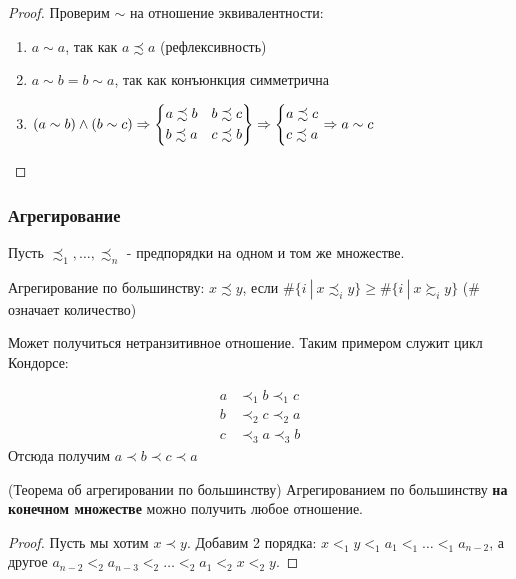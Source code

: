\begin{proof}
	Проверим $\sim$ на отношение эквивалентности:
	\begin{enumerate}
		\item $a \sim a$, так как $a \precsim a$ (рефлексивность)
		\item $a \sim b = b \sim a$, так как конъюнкция симметрична
		\item $(a \sim b) \wedge (b \sim c) \Rightarrow \left\{\begin{aligned}
			a \precsim b & &b \precsim c \\ b \precsim a & &c \precsim b
		\end{aligned}\right\} \Rightarrow \left\{\begin{aligned}a \precsim c \\ c \precsim a\end{aligned}\right. \Rightarrow a \sim c$
	\end{enumerate}
\end{proof}

\subsubsection*{Агрегирование}

\begin{definition}
	Пусть $\precsim_1, \dots, \precsim_n$ - предпорядки на одном и том же множестве.
	
	Агрегирование по большинству: $x \precsim y$, если $\#\{i\ |\ x \precsim_i y\} \ge \#\{i\ |\ x \succsim_i y\}$ ($\#$ означает количество)
\end{definition}

\begin{note}
	Может получиться нетранзитивное отношение. Таким примером служит цикл Кондорсе:
	
	\begin{align*}
	a &\prec_1 b \prec_1 c
	\\
	b &\prec_2 c \prec_2 a
	\\
	c &\prec_3 a \prec_3 b
	\end{align*}
	Отсюда получим $a \prec b \prec c \prec a$
\end{note}

\begin{theorem} (Теорема об агрегировании по большинству)
	Агрегированием по большинству \textbf{на конечном множестве} можно получить любое отношение.
\end{theorem}

\begin{proof}
	Пусть мы хотим $x \prec y$. Добавим 2 порядка: $x <_1 y <_1 a_1 <_1 \dots <_1 a_{n - 2}$, а другое $a_{n - 2} <_2 a_{n - 3} <_2 \dots <_2 a_1 <_2 x <_2 y$.
\end{proof}

